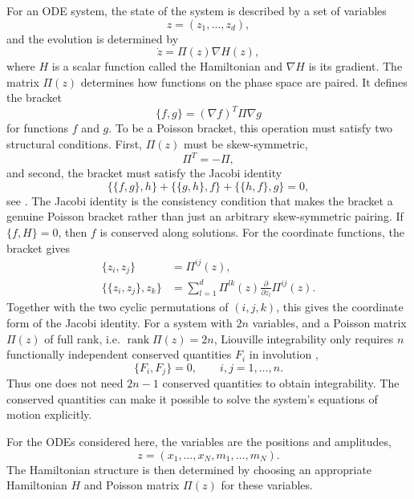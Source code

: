 \documentclass[english,master]{liumaiex}
\theoremstyle{thesisplain}
\theoremstyle{thesisdefinition}
\numberwithin{equation}{section}
\begin{document}
For an ODE system, the state of the system is described by a set of variables
\begin{equation}
	 z = (z_1,\dots,z_d),
\end{equation}
and the evolution is determined by
\begin{equation}
	 \dot z = \Pi(z)\nabla H(z),
\end{equation}
where $H$ is a scalar function called the Hamiltonian and $\nabla H$ is its gradient. The matrix $\Pi(z)$ determines how functions on the phase space are paired. It defines the bracket
\begin{equation}
	\{f,g\} = (\nabla f)^T \Pi \nabla g
\end{equation}
for functions $f$ and $g$. To be a Poisson bracket, this operation must satisfy two structural conditions. First, $\Pi(z)$ must be skew-symmetric,
\begin{equation}
	\Pi^T = -\Pi,
\end{equation}
and second, the bracket must satisfy the Jacobi identity
\begin{equation}
	\{\{f,g\},h\} + \{\{g,h\},f\} + \{\{h,f\},g\} = 0,
\end{equation}
see \cite{Olver_1968}. The Jacobi identity is the consistency condition that makes the bracket a genuine Poisson bracket rather than just an arbitrary skew-symmetric pairing. If $\{f,H\}=0$, then $f$ is conserved along solutions. For the coordinate functions, the bracket gives
\begin{align}
	\{z_i, z_j\} &= \Pi^{ij}(z), \\
	\{\{z_i, z_j\}, z_k\} &= \sum_{l=1}^d \Pi^{lk}(z) \frac{\partial}{\partial z_l} \Pi^{ij}(z).
\end{align}
Together with the two cyclic permutations of $(i,j,k)$, this gives the coordinate form of the Jacobi identity. For a system with $2n$ variables, and a Poisson matrix $\Pi(z)$ of full rank, i.e. $\operatorname{rank}\Pi(z)=2n$, Liouville integrability only requires $n$ functionally independent conserved quantities $F_i$ in involution \cite{Olver_1968},
\begin{equation}
	\{F_i, F_j\} = 0, \qquad i,j = 1,\ldots,n.
\end{equation}
Thus one does not need $2n-1$ conserved quantities to obtain integrability. The conserved quantities can make it possible to solve the system's equations of motion explicitly.

For the ODEs considered here, the variables are the positions and amplitudes,
\begin{equation}
	z = (x_1,\dots,x_N,m_1,\dots,m_N).
\end{equation}
The Hamiltonian structure is then determined by choosing an appropriate Hamiltonian $H$ and Poisson matrix $\Pi(z)$ for these variables.
\end{document}
